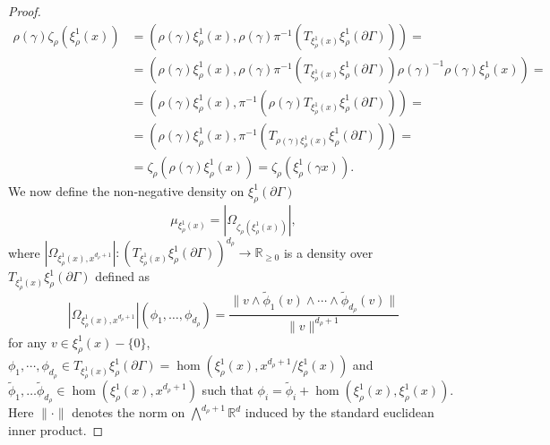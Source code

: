 \documentclass{report}
\begin{document}
\begin{proof}
    \begin{align*}
        \rho(\gamma) \zeta_\rho(\xi_\rho^1(x)) &=
         \left( \rho(\gamma) \xi_\rho^1(x), 
            \rho(\gamma) \pi^{-1}(T_{\xi_\rho^1(x)} \xi_\rho^1(\partial \Gamma)) \right) =\\
        &= \left( \rho(\gamma) \xi_\rho^1(x), 
        \rho(\gamma) \pi^{-1}(T_{\xi_\rho^1(x)} \xi_\rho^1(\partial \Gamma)) \rho(\gamma)^{-1} \rho(\gamma) \xi_\rho^1(x) \right) =\\
        &= \left( \rho(\gamma) \xi_\rho^1(x), 
           \pi^{-1}(\rho(\gamma) T_{\xi_\rho^1(x)} \xi_\rho^1(\partial \Gamma)) \right) =\\
        &= \left( \rho(\gamma) \xi_\rho^1(x), 
        \pi^{-1}(T_{\rho(\gamma) \xi_\rho^1(x)} \xi_\rho^1(\partial \Gamma)) \right) =\\
        &= \zeta_\rho(\rho(\gamma) \xi_\rho^1(x)) = 
        \zeta_\rho( \xi_\rho^1(\gamma x)).
    \end{align*}
    We now define the non-negative density on $\xi_\rho^1(\partial \Gamma)$
    \[
        \mu_{\xi_\rho^1(x)} = |\Omega_{\zeta_\rho(\xi_\rho^1(x))}|,
    \]
    where $\left|\Omega_{\xi^1_\rho(x), x^{d_\rho + 1}}\right|: \left( T_{\xi_\rho^1(x)} \xi_\rho^1(\partial \Gamma) \right)^{d_\rho} \to \mathbb R_{\geq 0}$ is a density over $T_{\xi_\rho^1(x)} \xi_\rho^1(\partial \Gamma)$ defined as
    \[
        |\Omega_{\xi^1_\rho(x), x^{d_\rho + 1}}|(\phi_1, \ldots, \phi_{d_\rho}) = 
        \frac{\| v \wedge \tilde \phi_1(v) \wedge \cdots \wedge \tilde \phi_{d_\rho} (v) \|}{\|v\|^{d_\rho+1}}
    \]
    for any $v \in \xi_\rho^1(x) - \{ 0\}$, 
    $\phi_1, \cdots, \phi_{d_\rho} \in T_{\xi_\rho^1(x)}\xi_\rho^1(\partial \Gamma) = \hom(\xi_\rho^1(x), x^{d_\rho+1}/\xi_\rho^1(x))$ and 
    $\tilde \phi_1, \ldots \tilde \phi_{d_\rho} \in \hom(\xi_\rho^1(x), x^{d_\rho + 1})$ such that $\phi_i = \tilde \phi_i + \hom(\xi_\rho^1(x), \xi_\rho^1(x))$.
    Here $\| \cdot \|$ denotes the norm on $\bigwedge^{d_\rho+1} \mathbb R^d$ induced by the standard euclidean inner product.


\end{proof}
\end{document}
